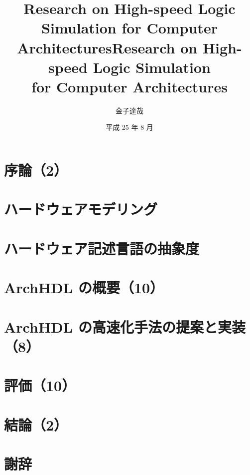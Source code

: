 \documentclass[12pt,openany,papersize,]{jsbook}
\title{Research on High-speed Logic Simulation for Computer Architectures}
\affiliation{情報工学科}
\title{Research on High-speed Logic Simulation \\ for Computer Architectures}
\author{金子達哉}
\date{平成 25 年 8 月}
\begin{document}
\maketitle

\frontmatter

\tableofcontents

\mainmatter

\chapter{序論（2）}



\chapter{ハードウェアモデリング}



 \chapter{ハードウェア記述言語の抽象度} \fi

\chapter{ArchHDL の概要（10）}

\label{c:summary}



\chapter{ArchHDL の高速化手法の提案と実装（8）}

\label{c:method}



\chapter{評価（10）}

\label{c:evaluation}



\chapter{結論（2）}

\label{c:conclusion}



\backmatter

\chapter{謝辞}

\label{c:acknowledgment}



\label{c:relatedwork}


\end{document}
